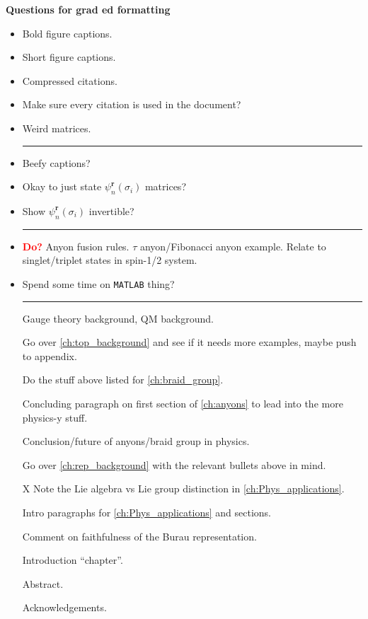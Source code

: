\textbf{Questions for grad ed formatting}
\begin{itemize}
    \item Bold figure captions.
    \item Short figure captions.
    \item Compressed citations.
    \item Make sure every citation is used in the document?
    \item Weird matrices.
    
    \begin{center}\rule{.85\textwidth}{0.65pt}\end{center}
    
    \item Beefy captions?
    \item Okay to just state $\psi_n^\textbf{r}(\sigma_i)$ matrices?
    \item Show $\psi_n^\textbf{r}(\sigma_i)$ invertible?
    
    \begin{center}\rule{.85\textwidth}{0.65pt}\end{center}
    
    \item \textbf{\textcolor{red}{Do?}} Anyon fusion rules. $\tau$ anyon/Fibonacci anyon example. Relate to singlet/triplet states in spin-1/2 system.
    \item Spend some time on \texttt{MATLAB} thing?

    \begin{center}\rule{.85\textwidth}{0.65pt}\end{center}
    \item[\checkmark] Gauge theory background, QM background.
    \item[\checkmark] Go over \cref{ch:top_background} and see if it needs more examples, maybe push to appendix.
    \item[\checkmark] Do the stuff above listed for \cref{ch:braid_group}.
    \item[\checkmark] Concluding paragraph on first section of \cref{ch:anyons} to lead into the more physics-y stuff.
    \item[\checkmark] Conclusion/future of anyons/braid group in physics.
    \item[\checkmark] Go over \cref{ch:rep_background} with the relevant bullets above in mind.
    \item[X] Note the Lie algebra vs Lie group distinction in \cref{ch:Phys_applications}.
    \item[\checkmark] Intro paragraphs for \cref{ch:Phys_applications} and sections.
    \item[\checkmark] Comment on faithfulness of the Burau representation.
    \item[\checkmark] Introduction ``chapter''.
    \item[\checkmark] Abstract.
    \item[\checkmark] Acknowledgements.
\end{itemize}
